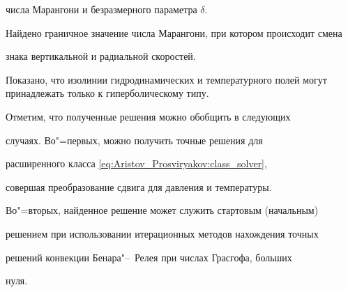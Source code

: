 числа Марангони и безразмерного параметра $\delta.$ 

Найдено граничное значение числа Марангони, при котором происходит смена

знака вертикальной и радиальной скоростей. 

Показано, что изолинии гидродинамических и температурного полей могут принадлежать только к гиперболическому типу.





Отметим, что полученные решения можно обобщить в следующих

случаях. Во"=первых, можно получить точные решения для

расширенного класса \eqref{eq:Aristov_Prosviryakov:class_solver},

совершая преобразование сдвига для давления и температуры.

Во"=вторых, найденное решение может служить стартовым (начальным)

решением при использовании итерационных методов нахождения точных

решений конвекции Бенара"--~Релея при числах Грасгофа, больших

нуля.



\renewcommand{\baselinestretch}{0.85}




